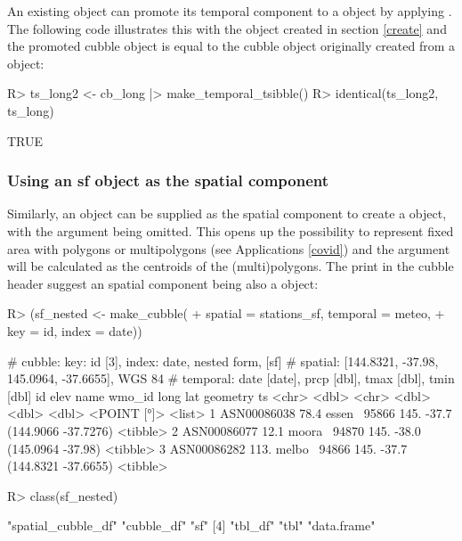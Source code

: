 \documentclass[
  shortnames]{jss}
\begin{document}
An existing  object can promote its temporal component to a  object by applying . The following code illustrates this with the object  created in section \ref{create} and the promoted cubble object is equal to the cubble object originally created from a  object:

\begin{CodeChunk}
\begin{CodeInput}
R> ts_long2 <- cb_long |> make_temporal_tsibble() 
R> identical(ts_long2, ts_long)
\end{CodeInput}
\begin{CodeOutput}
[1] TRUE
\end{CodeOutput}
\end{CodeChunk}

\hypertarget{using-an-sf-object-as-the-spatial-component}{%
\subsubsection{Using an sf object as the spatial component}\label{using-an-sf-object-as-the-spatial-component}}

Similarly, an  object can be supplied as the spatial component to create a  object, with the  argument being omitted. This opens up the possibility to represent fixed area with polygons or multipolygons (see Applications \ref{covid}) and the  argument will be calculated as the centroids of the (multi)polygons. The \code{[sf]} print in the cubble header suggest an spatial component being also a  object:

\begin{CodeChunk}
\begin{CodeInput}
R> (sf_nested <- make_cubble(
+   spatial = stations_sf, temporal = meteo, 
+   key = id, index = date))
\end{CodeInput}
\begin{CodeOutput}
# cubble:   key: id [3], index: date, nested form, [sf]
# spatial:  [144.8321, -37.98, 145.0964, -37.6655], WGS 84
# temporal: date [date], prcp [dbl], tmax [dbl], tmin [dbl]
  id           elev name   wmo_id  long   lat            geometry ts      
  <chr>       <dbl> <chr>   <dbl> <dbl> <dbl>         <POINT [°]> <list>  
1 ASN00086038  78.4 essen~  95866  145. -37.7 (144.9066 -37.7276) <tibble>
2 ASN00086077  12.1 moora~  94870  145. -38.0   (145.0964 -37.98) <tibble>
3 ASN00086282 113.  melbo~  94866  145. -37.7 (144.8321 -37.6655) <tibble>
\end{CodeOutput}
\begin{CodeInput}
R> class(sf_nested)
\end{CodeInput}
\begin{CodeOutput}
[1] "spatial_cubble_df" "cubble_df"         "sf"               
[4] "tbl_df"            "tbl"               "data.frame"       
\end{CodeOutput}
\end{CodeChunk}
\end{document}
